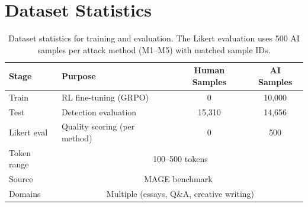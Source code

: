 \documentclass[11pt]{article}
\begin{document}
\section{Dataset Statistics}
\label{app:dataset}

\begin{table}[H]
\centering
\small
\begin{tabular}{llcc}
\toprule
\textbf{Stage} & \textbf{Purpose} & \textbf{Human Samples} & \textbf{AI Samples} \\
\midrule
Train           & RL fine-tuning (GRPO)       & 0 & 10,000 \\
Test            & Detection evaluation        & 15,310  & 14,656  \\
Likert eval     & Quality scoring (per method) & 0     & 500    \\
\midrule
Token range     & \multicolumn{3}{c}{100--500 tokens} \\
Source          & \multicolumn{3}{c}{MAGE benchmark~\cite{li2024magemachinegeneratedtextdetection}} \\
Domains         & \multicolumn{3}{c}{Multiple (essays, Q\&A, creative writing)} \\
\bottomrule
\end{tabular}
\caption{Dataset statistics for training and evaluation. The Likert evaluation uses 500 AI samples per attack method (M1--M5) with matched sample IDs.}
\label{tab:dataset}
\end{table}
\end{document}
